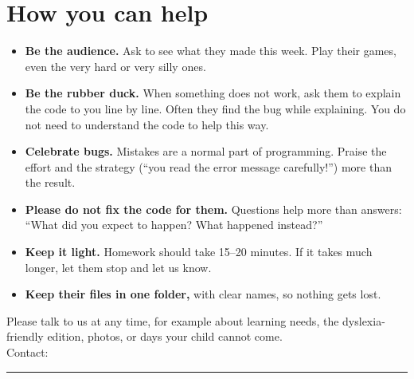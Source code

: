 \documentclass[level=2]{kidscode}
\begin{document}
\section{How you can help}
\begin{itemize}[itemsep=2pt]
  \item \textbf{Be the audience.} Ask to see what they made this week. Play their games, even
        the very hard or very silly ones.
  \item \textbf{Be the rubber duck.} When something does not work, ask them to explain the code to
        you line by line. Often they find the bug while explaining. You do not need to understand
        the code to help this way.
  \item \textbf{Celebrate bugs.} Mistakes are a normal part of programming. Praise the effort and
        the strategy (\enquote{you read the error message carefully!}) more than the result.
  \item \textbf{Please do not fix the code for them.} Questions help more than answers:
        \enquote{What did you expect to happen? What happened instead?}
  \item \textbf{Keep it light.} Homework should take 15--20 minutes. If it takes much longer,
        let them stop and let us know.
  \item \textbf{Keep their files in one folder,} with clear names, so nothing gets lost.
\end{itemize}

\begin{tip}
Please talk to us at any time, for example about learning needs, the dyslexia-friendly edition,
photos, or days your child cannot come.\\[6pt]
Contact: \rule{7cm}{0.4pt}
\end{tip}
\end{document}
